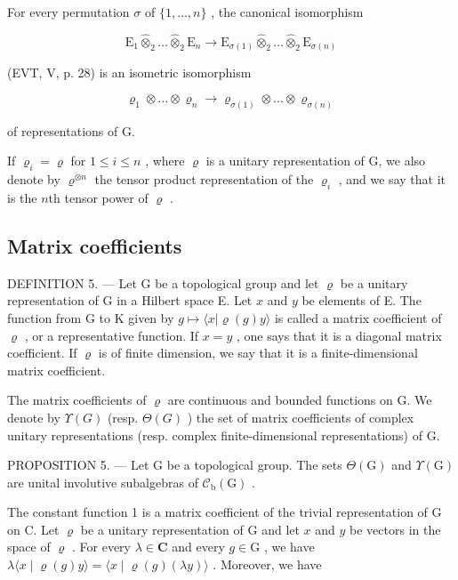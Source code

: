 For every permutation \(\sigma\) of \(\{1,\ldots,n\}\) , the canonical isomorphism

\[
\mathrm{E} _ {1} \widehat {\otimes} _ {2} \dots \widehat {\otimes} _ {2} \mathrm{E} _ {n} \rightarrow \mathrm{E} _ {\sigma (1)} \widehat {\otimes} _ {2} \dots \widehat {\otimes} _ {2} \mathrm{E} _ {\sigma (n)}
\]

(EVT, V, p. 28) is an isometric isomorphism

\[
\varrho_ {1} \otimes \dots \otimes \varrho_ {n} \rightarrow \varrho_ {\sigma (1)} \otimes \dots \otimes \varrho_ {\sigma (n)}
\]

of representations of G.

If \(\varrho_{i}=\varrho\) for \(1\leqslant i\leqslant n\) , where \(\varrho\) is a unitary representation of G, we also denote by \(\varrho^{\otimes n}\) the tensor product representation of the \(\varrho_{i}\) , and we say that it is the \(n\)th tensor power of \(\varrho\) .

\subsection{Matrix coefficients}

DEFINITION 5. --- Let G be a topological group and let \(\varrho\) be a unitary representation of G in a Hilbert space E. Let \(x\) and \(y\) be elements of E. The function from G to K given by \(g \mapsto \langle x | \varrho(g)y \rangle\) is called a matrix coefficient of \(\varrho\) , or a representative function. If \(x = y\) , one says that it is a diagonal matrix coefficient. If \(\varrho\) is of finite dimension, we say that it is a finite-dimensional matrix coefficient.

The matrix coefficients of \(\varrho\) are continuous and bounded functions on G. We denote by \(\Upsilon(G)\) (resp. \(\Theta(G)\) ) the set of matrix coefficients of complex unitary representations (resp. complex finite-dimensional representations) of G.

PROPOSITION 5. — Let G be a topological group. The sets \(\Theta(\mathrm{G})\) and \(\Upsilon(\mathrm{G})\) are unital involutive subalgebras of \(\mathcal{C}_{\mathrm{b}}(\mathrm{G})\) .

The constant function 1 is a matrix coefficient of the trivial representation of G on C. Let \(\varrho\) be a unitary representation of G and let \(x\) and \(y\) be vectors in the space of \(\varrho\) . For every \(\lambda \in \mathbf{C}\) and every \(g \in \mathrm{G}\) , we have \(\lambda \langle x \mid \varrho(g)y \rangle = \langle x \mid \varrho(g)(\lambda y) \rangle\) . Moreover, we have

